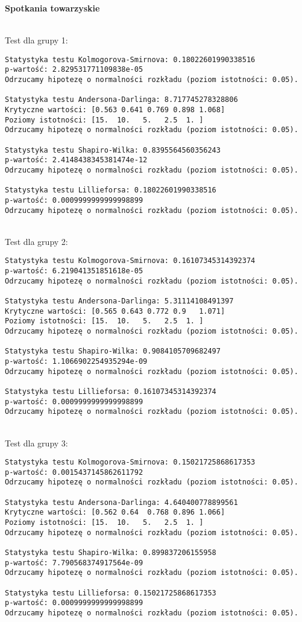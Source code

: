 \documentclass[12pt,a4paper]{article}
\begin{document}
\newpage
\begin{center}
    \textbf{Spotkania towarzyskie}
\end{center}
\\
Test dla grupy 1:
\begin{lstlisting}
Statystyka testu Kolmogorova-Smirnova: 0.18022601990338516
p-wartość: 2.829531771109838e-05 
Odrzucamy hipotezę o normalności rozkładu (poziom istotności: 0.05).

Statystyka testu Andersona-Darlinga: 8.717745278328806
Krytyczne wartości: [0.563 0.641 0.769 0.898 1.068]
Poziomy istotności: [15.  10.   5.   2.5  1. ] 
Odrzucamy hipotezę o normalności rozkładu (poziom istotności: 0.05).

Statystyka testu Shapiro-Wilka: 0.8395564560356243
p-wartość: 2.4148438345381474e-12
Odrzucamy hipotezę o normalności rozkładu (poziom istotności: 0.05).

Statystyka testu Lillieforsa: 0.18022601990338516
p-wartość: 0.0009999999999998899
Odrzucamy hipotezę o normalności rozkładu (poziom istotności: 0.05).
\end{lstlisting}
\\
Test dla grupy 2:
\begin{lstlisting}
Statystyka testu Kolmogorova-Smirnova: 0.16107345314392374
p-wartość: 6.219041351851618e-05 
Odrzucamy hipotezę o normalności rozkładu (poziom istotności: 0.05).

Statystyka testu Andersona-Darlinga: 5.31114108491397
Krytyczne wartości: [0.565 0.643 0.772 0.9   1.071]
Poziomy istotności: [15.  10.   5.   2.5  1. ]
Odrzucamy hipotezę o normalności rozkładu (poziom istotności: 0.05).

Statystyka testu Shapiro-Wilka: 0.9084105709682497
p-wartość: 1.1066902254935294e-09
Odrzucamy hipotezę o normalności rozkładu (poziom istotności: 0.05).

Statystyka testu Lillieforsa: 0.16107345314392374
p-wartość: 0.0009999999999998899
Odrzucamy hipotezę o normalności rozkładu (poziom istotności: 0.05).
\end{lstlisting}
\\
Test dla grupy 3:
\begin{lstlisting}
Statystyka testu Kolmogorova-Smirnova: 0.15021725868617353
p-wartość: 0.0015437145862611792 
Odrzucamy hipotezę o normalności rozkładu (poziom istotności: 0.05).

Statystyka testu Andersona-Darlinga: 4.640400778899561
Krytyczne wartości: [0.562 0.64  0.768 0.896 1.066]
Poziomy istotności: [15.  10.   5.   2.5  1. ]
Odrzucamy hipotezę o normalności rozkładu (poziom istotności: 0.05).

Statystyka testu Shapiro-Wilka: 0.899837206155958
p-wartość: 7.790568374917564e-09
Odrzucamy hipotezę o normalności rozkładu (poziom istotności: 0.05).

Statystyka testu Lillieforsa: 0.15021725868617353
p-wartość: 0.0009999999999998899
Odrzucamy hipotezę o normalności rozkładu (poziom istotności: 0.05).
\end{lstlisting}
\end{document}
